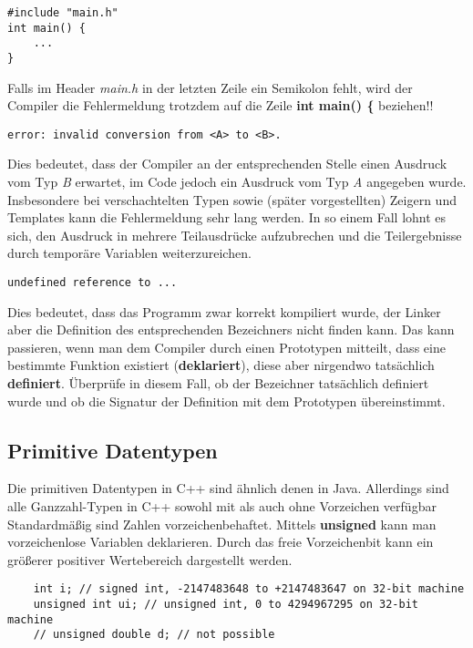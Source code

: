 \begin{lstlisting}
#include "main.h"
int main() {
	...
}
\end{lstlisting}

Falls im Header \emph{main.h} in der letzten Zeile ein Semikolon fehlt, wird der Compiler die Fehlermeldung trotzdem auf die Zeile \textbf{int main() \{} beziehen!!

\begin{verbatim}
error: invalid conversion from <A> to <B>.
\end{verbatim}

Dies bedeutet, dass der Compiler an der entsprechenden Stelle einen Ausdruck vom Typ \emph{B} erwartet, im Code jedoch ein Ausdruck vom Typ \emph{A} angegeben wurde. Insbesondere bei verschachtelten Typen sowie (später vorgestellten) Zeigern und Templates kann die Fehlermeldung sehr lang werden. In so einem Fall lohnt es sich, den Ausdruck in mehrere Teilausdrücke aufzubrechen und die Teilergebnisse durch temporäre Variablen weiterzureichen.

\begin{verbatim}
undefined reference to ...
\end{verbatim}

Dies bedeutet, dass das Programm zwar korrekt kompiliert wurde, der Linker aber die Definition des entsprechenden Bezeichners nicht finden kann.
Das kann passieren, wenn man dem Compiler durch einen Prototypen mitteilt, dass eine bestimmte Funktion existiert (\textbf{deklariert}), diese aber nirgendwo tatsächlich \textbf{definiert}.
Überprüfe in diesem Fall, ob der Bezeichner tatsächlich definiert wurde und ob die Signatur der Definition mit dem Prototypen übereinstimmt.


\subsection{Primitive Datentypen}
Die primitiven Datentypen in C++ sind ähnlich denen in Java.
Allerdings sind alle Ganzzahl-Typen in C++ sowohl mit als auch ohne Vorzeichen verfügbar
Standardmäßig sind Zahlen vorzeichenbehaftet.
Mittels \textbf{unsigned} kann man vorzeichenlose Variablen deklarieren.
Durch das freie Vorzeichenbit kann ein größerer positiver Wertebereich dargestellt werden.

\begin{lstlisting}
 	int i; // signed int, -2147483648 to +2147483647 on 32-bit machine
	unsigned int ui; // unsigned int, 0 to 4294967295 on 32-bit machine
	// unsigned double d; // not possible
\end{lstlisting}


